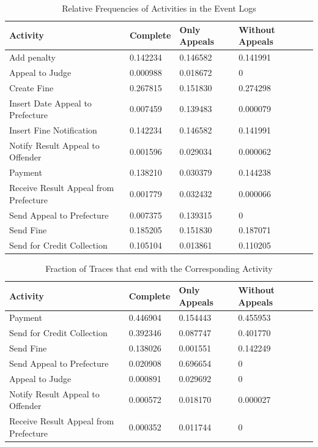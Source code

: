 \documentclass[12pt]{report}
\begin{document}
\begin{table}[H]
\centering
\begin{tabular}{|l|l|l|l|l|}
\hline \textbf{Activity} & \textbf{Complete} & \textbf{Only Appeals} & \textbf{Without Appeals} \\
\hline Add penalty & 0.142234 & 0.146582 & 0.141991\\
\hline Appeal to Judge & 0.000988 & 0.018672 &0\\
\hline Create Fine & 0.267815 & 0.151830 & 0.274298\\
\hline Insert Date Appeal to Prefecture & 0.007459 & 0.139483 & 0.000079\\
\hline Insert Fine Notification & 0.142234 & 0.146582 & 0.141991\\
\hline Notify Result Appeal to Offender & 0.001596 & 0.029034 & 0.000062\\
\hline Payment  & 0.138210 & 0.030379 & 0.144238\\
\hline Receive Result Appeal from Prefecture & 0.001779 & 0.032432 & 0.000066\\
\hline Send Appeal to Prefecture  & 0.007375 & 0.139315 & 0\\
\hline Send Fine  & 0.185205 & 0.151830 & 0.187071\\
\hline Send for Credit Collection & 0.105104 & 0.013861 & 0.110205\\
\hline
\end{tabular}
\caption{Relative Frequencies of Activities in the Event Logs}
\label{tab:1c_relative}
\end{table}

\begin{table}[H]
\centering
\begin{tabular}{|l|l|l|l|l|}
\hline \textbf{Activity} & \textbf{Complete} & \textbf{Only Appeals} & \textbf{Without Appeals} \\
\hline Payment  & 0.446904 & 0.154443 & 0.455953\\
\hline Send for Credit Collection & 0.392346 & 0.087747 & 0.401770\\
\hline Send Fine  & 0.138026 & 0.001551 & 0.142249\\
\hline Send Appeal to Prefecture  & 0.020908 & 0.696654 & 0\\
\hline Appeal to Judge & 0.000891 & 0.029692 &0\\
\hline Notify Result Appeal to Offender & 0.000572 & 0.018170 & 0.000027\\
\hline Receive Result Appeal from Prefecture & 0.000352 & 0.011744 & 0\\
\hline
\end{tabular}
\caption{Fraction of Traces that end with the Corresponding Activity}
\label{tab:1c_end}
\end{table}
\end{document}

